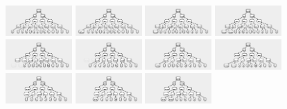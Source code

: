 \documentclass{article}
\begin{document}
\begin{figure}
\begin{center}
\includegraphics[width=1in]{../board/pics/ss301.png}
\includegraphics[width=1in]{../board/pics/ss351.png}
\includegraphics[width=1in]{../board/pics/ss401.png}
\includegraphics[width=1in]{../board/pics/ss451.png}
\includegraphics[width=1in]{../board/pics/ss501.png}
\includegraphics[width=1in]{../board/pics/ss551.png}
\includegraphics[width=1in]{../board/pics/ss601.png}
\includegraphics[width=1in]{../board/pics/ss651.png}
\includegraphics[width=1in]{../board/pics/ss701.png}
\includegraphics[width=1in]{../board/pics/ss751.png}
\includegraphics[width=1in]{../board/pics/ss801.png}

\end{center}
\end{figure}
\end{document}
